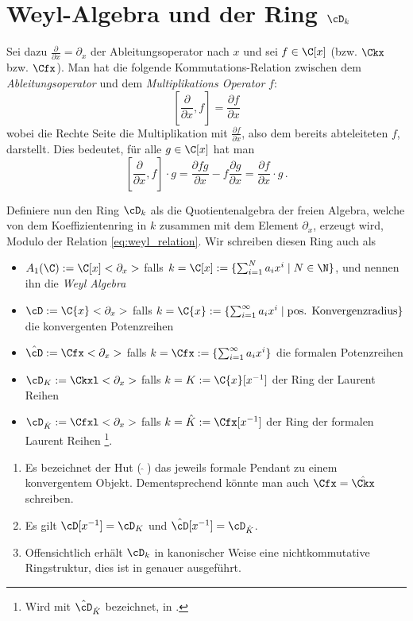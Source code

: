 \section{Weyl-Algebra und der Ring $\cD_k$}
Sei dazu $\frac{\partial}{\partial x}=\partial_x$ der Ableitungsoperator nach
$x$ und sei $f \in \C[x]$ (bzw. $\Ckx$ bzw. $\Cfx$).
Man hat die folgende
Kommutations-Relation zwischen dem \emph{Ableitungsoperator} und dem
\emph{Multiplikations Operator} $f$:
\begin{equation}\label{eq:weyl_relation}
[\frac{\partial}{\partial x},f]=\frac{\partial f}{\partial x}
\end{equation}
wobei die Rechte Seite die Multiplikation mit $\frac{\partial f}{\partial x}$,
also dem bereits abteleiteten $f$, darstellt. Dies bedeutet, für alle
$g\in\C[x]$ hat man
\[
[\frac{\partial}{\partial x},f]\cdot g
=\frac{\partial fg}{\partial x} - f\frac{\partial g}{\partial x}
=\frac{\partial f}{\partial x} \cdot g \,.
\]
\begin{defn}
Definiere nun den Ring $\cD_k$ als die Quotientenalgebra der freien Algebra,
welche von dem Koeffizientenring in $k$ zusammen mit dem Element $\partial_x$,
erzeugt wird, Modulo der Relation \eqref{eq:weyl_relation}.  Wir schreiben
diesen Ring auch als
\begin{itemize}
\item $A_1(\C):=\C[x]<\partial_x>$ falls $k=\C[x]:=\{ \sum^{N}_{i=1}a_ix^i \mid
  N\in \N \}$, und nennen ihn die \emph{Weyl Algebra}
\item $\cD:=\C\{x\}<\partial_x>$ falls $k=\C\{x\}:=\{ \sum^{\infty}_{i=1}a_ix^i
  \mid \mbox{pos.  Konvergenzradius}\}$ die konvergenten Potenzreihen
\item $\hat\cD:=\Cfx<\partial_x>$ falls $k=\Cfx:=\{\sum^{\infty}_{i=1}a_ix^i\}$
  die formalen Potenzreihen
\item $\cD_K:=\Ckxl<\partial_x>$ falls
$k=K:=\C\{x\}[x^{-1}]$ der Ring der Laurent Reihen
\item $\cD_{\hat K}:=\Cfxl<\partial_x>$ falls $k=\hat
K:=\Cfx[x^{-1}]$ der Ring der formalen Laurent Reihen
\footnote{Wird mit $\hat\cD_{\hat K}$ bezeichnet, in \cite{ZulaBarbara}.}.
\end{itemize}
\end{defn}
\begin{bem}
\begin{enumerate}
\item Es bezeichnet der Hut ($ \, \hat \,\, $) das jeweils formale Pendant
zu einem konvergentem Objekt. Dementsprechend könnte man auch $\Cfx=\hat{\Ckx}$
schreiben.
\item Es gilt $\cD[x^{-1}]=\cD_K$ und $\hat \cD[x^{-1}]=\cD_{\hat K}$.
\item Offensichtlich erhält $\cD_k$ in kanonischer Weise eine nichtkommutative
Ringstruktur, dies ist in \cite[Kapittel 2 Section 1]{ZulaBarbara} genauer
ausgeführt.
\end{enumerate}
\end{bem}

